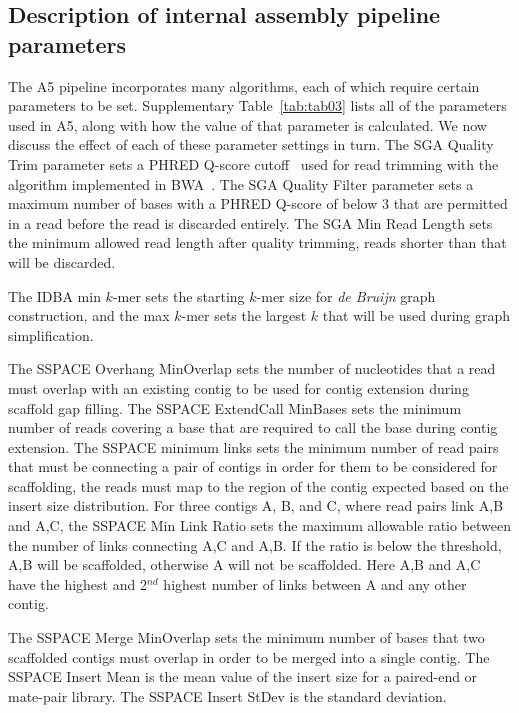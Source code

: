 \documentclass[10pt]{article}
\begin{document}
\clearpage

\renewcommand{\thesubsection}{Text S\arabic{subsection}.}
\subsection{Description of internal assembly pipeline parameters}

The A5 pipeline incorporates many algorithms, each of which require certain parameters to be set.
Supplementary Table~\ref{tab:tab03} lists all of the parameters used in A5, along with how the value
of that parameter is calculated. We now discuss the effect of each of these parameter settings in turn.  
The SGA Quality Trim parameter sets a PHRED Q-score cutoff~\cite{Ewing1998} used for read trimming with the algorithm
implemented in BWA~\cite{bwa}. The SGA Quality Filter parameter sets a maximum number of bases
with a PHRED Q-score of below 3 that are permitted in a read before the read is discarded entirely.
The SGA Min Read Length sets the minimum allowed read length after quality trimming, reads shorter
than that will be discarded.

The IDBA min $k$-mer sets the starting $k$-mer size for \emph{de Bruijn} graph construction, and the max $k$-mer sets
the largest $k$ that will be used during graph simplification.

The SSPACE Overhang MinOverlap sets the number of nucleotides that a read must overlap with an existing
contig to be used for contig extension during scaffold gap filling. The SSPACE ExtendCall MinBases sets the minimum
number of reads covering a base that are required to call the base during contig extension. The SSPACE minimum
links sets the minimum number of read pairs that must be connecting a pair of contigs in order for them to be considered
for scaffolding, the reads must map to the region of the contig expected based on the insert size distribution.
For three contigs A, B, and C, where read pairs link A,B and A,C, the SSPACE Min Link Ratio sets the 
maximum allowable ratio between the number of links connecting A,C and A,B. If the ratio is below the threshold,
A,B will be scaffolded, otherwise A will not be scaffolded. Here A,B and A,C have the highest and 2$^{nd}$ highest number
of links between A and any other contig.

The SSPACE Merge MinOverlap sets the minimum number of bases that two scaffolded contigs must overlap in order to be merged
into a single contig.  The SSPACE Insert Mean is the mean value of the insert size for a paired-end or mate-pair library. 
The SSPACE Insert StDev is the standard deviation.
\end{document}
